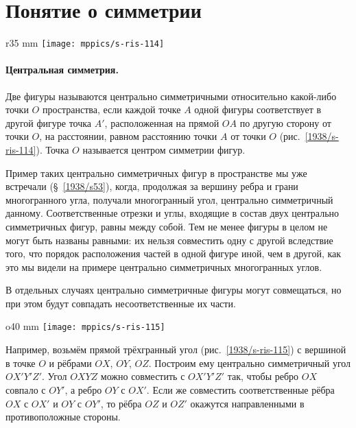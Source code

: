 \section{Понятие о симметрии}

\begin{wrapfigure}{r}{35 mm}
\vskip-4mm
\centering
\texttt{[image: mppics/s-ris-114]}
\caption{}\label{1938/s-ris-114}
\vskip-0mm
\end{wrapfigure}

\paragraph{Центральная симметрия.}\label{1938/s99}
Две фигуры называются центрально симметричными относительно какой-либо точки $O$ пространства, если каждой точке $A$ одной фигуры соответствует в другой фигуре точка $A'$, расположенная на прямой $OA$ по другую сторону от точки $O$, на расстоянии, равном расстоянию точки $A$ от точки $O$ (рис.~\ref{1938/s-ris-114}).
Точка $O$ называется центром симметрии фигур.

Пример таких центрально симметричных фигур в пространстве мы уже встречали (§~\ref{1938/s53}), когда, продолжая за вершину ребра и грани многогранного угла, получали многогранный угол, центрально симметричный данному.
Соответственные отрезки и углы, входящие в состав двух центрально симметричных фигур, равны между собой.
Тем не менее фигуры в целом не могут быть названы равными: их нельзя совместить одну с другой вследствие того, что порядок расположения частей в одной фигуре иной, чем в другой, как это мы видели на примере центрально симметричных многогранных углов.

В отдельных случаях центрально симметричные фигуры могут совмещаться, но при этом будут совпадать несоответственные их части.

\begin{wrapfigure}{o}{40 mm}
\vskip-2mm
\centering
\texttt{[image: mppics/s-ris-115]}
\caption{}\label{1938/s-ris-115}
\vskip-0mm
\end{wrapfigure}

Например, возьмём прямой трёхгранный угол (рис.~\ref{1938/s-ris-115}) с вершиной в точке $O$ и рёбрами $OX$, $OY$, $OZ$.
Построим ему центрально симметричный угол $OX'Y'Z'$.
Угол $OXYZ$ можно совместить с $OX'Y'Z'$ так, чтобы ребро $OX$ совпало с $OY'$, а ребро $OY$ с $OX'$.
Если же совместить соответственные рёбра $OX$ с $OX'$ и $OY$ с $OY'$, то рёбра $OZ$ и $OZ'$ окажутся направленными в противоположные стороны.

